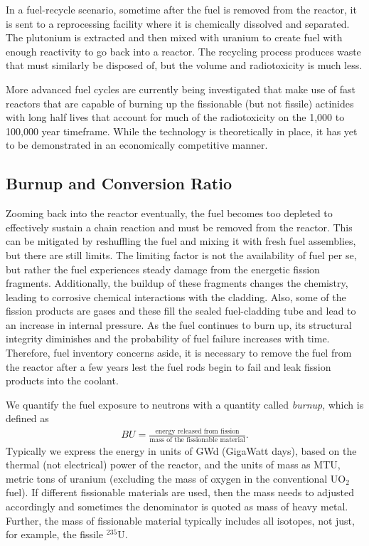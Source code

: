 In a fuel-recycle scenario, sometime after the fuel is removed from the reactor, it is sent to a reprocessing facility where it is chemically dissolved and separated. The plutonium is extracted and then mixed with uranium to create fuel with enough reactivity to go back into a reactor. The recycling process produces waste that must similarly be disposed of, but the volume and radiotoxicity is much less. 

More advanced fuel cycles are currently being investigated that make use of fast reactors that are capable of burning up the fissionable (but not fissile) actinides with long half lives that account for much of the radiotoxicity on the 1,000 to 100,000 year timeframe. While the technology is theoretically in place, it has yet to be demonstrated in an economically competitive manner.

\subsection{Burnup and Conversion Ratio}

Zooming back into the reactor eventually, the fuel becomes too depleted to effectively sustain a chain reaction and must be removed from the reactor. This can be mitigated by reshuffling the fuel and mixing it with fresh fuel assemblies, but there are still limits. The limiting factor is not the availability of fuel per se, but rather the fuel experiences steady damage from the energetic fission fragments. Additionally, the buildup of these fragments changes the chemistry, leading to corrosive chemical interactions with the cladding. Also, some of the fission products are gases and these fill the sealed fuel-cladding tube and lead to an increase in internal pressure. As the fuel continues to burn up, its structural integrity diminishes and the probability of fuel failure increases with time. Therefore, fuel inventory concerns aside, it is necessary to remove the fuel from the reactor after a few years lest the fuel rods begin to fail and leak fission products into the coolant.

We quantify the fuel exposure to neutrons with a quantity called \emph{burnup}, which is defined as
\begin{align}
  BU = \frac{\text{energy released from fission}}{\text{mass of the fissionable material}} .
\end{align}
Typically we express the energy in units of GWd (GigaWatt days), based on the thermal (not electrical) power of the reactor, and the units of mass as MTU, metric tons of uranium (excluding the mass of oxygen in the conventional UO$_2$ fuel). If different fissionable materials are used, then the mass needs to adjusted accordingly and sometimes the denominator is quoted as mass of heavy metal. Further, the mass of fissionable material typically includes all isotopes, not just, for example, the fissile $^{235}$U.

